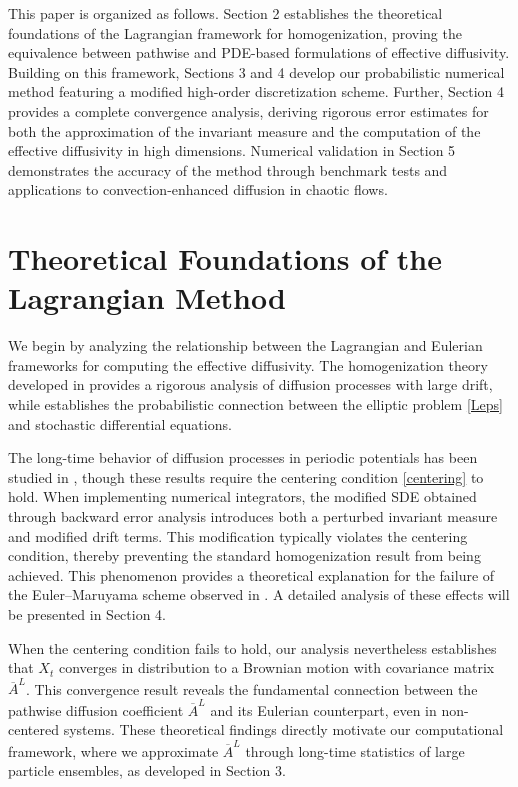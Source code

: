 \documentclass[12pt,a4paper,reqno]{amsart}
\numberwithin{equation}{section}
\begin{document}
This paper is organized as follows. Section 2 establishes the theoretical foundations of the Lagrangian framework for homogenization, proving the equivalence between pathwise and PDE-based formulations of effective diffusivity. Building on this framework, Sections 3 and 4 develop our probabilistic numerical method featuring a modified high-order discretization scheme. Further, Section 4 provides a complete convergence analysis, deriving rigorous error estimates for both the approximation of the invariant measure and the computation of the effective diffusivity in high dimensions. Numerical validation in Section 5 demonstrates the accuracy of the method through benchmark tests and applications to convection-enhanced diffusion in chaotic flows.


\section{Theoretical Foundations of the Lagrangian Method}

We begin by analyzing the relationship between the Lagrangian and Eulerian frameworks for computing the effective diffusivity. The homogenization theory developed in \cite{BLP11,JZ23,PS08} provides a rigorous analysis of diffusion processes with large drift, while \cite{BLP11} establishes the probabilistic connection between the elliptic problem \eqref{Leps} and stochastic differential equations.

The long-time behavior of diffusion processes in periodic potentials has been studied in \cite{Cap98,Gar97}, though these results require the centering condition \eqref{centering} to hold. When implementing numerical integrators, the modified SDE obtained through backward error analysis introduces both a perturbed invariant measure and modified drift terms. This modification typically violates the centering condition, thereby preventing the standard homogenization result from being achieved. This phenomenon provides a theoretical explanation for the failure of the Euler--Maruyama scheme observed in \cite{PSZ09,WXZ18}. A detailed analysis of these effects will be presented in Section 4.

When the centering condition fails to hold, our analysis nevertheless establishes that $X_t$ converges in distribution to a Brownian motion with covariance matrix $\overline{A}^L$. 
This convergence result reveals the fundamental connection between the pathwise diffusion coefficient $\overline{A}^L$ and its Eulerian counterpart, even in non-centered systems. These theoretical findings directly motivate our computational framework, where we approximate $\overline{A}^L$ through long-time statistics of large particle ensembles, as developed in Section 3. 
 
\end{document}
